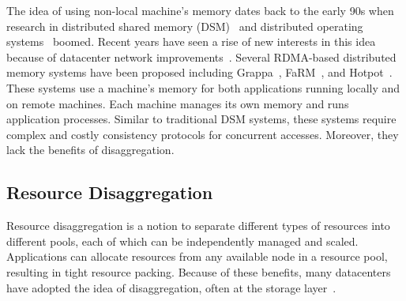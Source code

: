 The idea of using non-local machine's memory dates back to the early 90s when research in 
distributed shared memory (DSM)~\cite{Shasta,Bennett90-PPOPP,Fleisch89-SOSP,Keleher92-ISCA} 
and distributed operating systems~\cite{Sprite88,Amoeba90} boomed.
Recent years have seen a rise of new interests in this idea because of datacenter network improvements~\cite{Aguilera17-SOCC}.
Several RDMA-based distributed memory systems have been proposed %
including Grappa~\cite{Nelson15-ATC}, FaRM~\cite{FaRM}, and Hotpot~\cite{Shan17-SOCC}.
These systems use a machine's memory for both applications running locally and on remote machines.
Each machine manages its own memory and runs application processes.
Similar to traditional DSM systems, these systems require complex and costly consistency protocols for concurrent accesses.
Moreover, %
they lack the benefits of disaggregation. %

\subsection{Resource Disaggregation}
\label{sec:disaggregation}

Resource disaggregation is a notion to separate different types of resources into different pools,
each of which can be independently managed and scaled.
Applications can allocate resources from any available node in a resource pool, resulting in tight resource packing. %
Because of these benefits, %
many datacenters have adopted the idea of disaggregation, often at the storage 
layer~\cite{FACEBOOK-BRYCECANYON,FB1,SnowFlake-NSDI20,AMAZON-S3,AMAZON-EBS,Ali-SinglesDay}.

